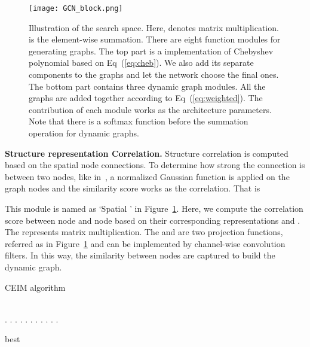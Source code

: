 \documentclass[letterpaper]{article} \usepackage{aaai19}  \usepackage{times}  \usepackage{helvet} \usepackage{courier}  \usepackage[hyphens]{url}  \usepackage{graphicx} \urlstyle{rm} \def\UrlFont{\rm}  \usepackage{graphicx}  \frenchspacing  \setlength{\pdfpagewidth}{8.5in}  \setlength{\pdfpageheight}{11in}
\begin{document}
\begin{figure}[thbp!]
\centering
\texttt{[image: GCN\_block.png]}
\caption{\small{ Illustration of the search space. Here,  denotes matrix multiplication.  is the element-wise summation. There are eight function modules for generating graphs. The top part is a implementation of Chebyshev polynomial based on Eq~(\ref{eq:cheb}). We also add its separate components to the graphs and let the network choose the final ones. The bottom part contains three dynamic graph modules. All the graphs are added together according to Eq~(\ref{eq:weighted}). The contribution of each module works as the architecture parameters. Note that there is a softmax function before the summation operation for dynamic graphs. 
}}
\label{Fig:framework}
\vspace{0.5em}
\end{figure}

\noindent \textbf{Structure representation Correlation.} Structure correlation is computed based on the spatial node connections. To determine how strong the connection is between two nodes, like in~\cite{shi2019two}, a normalized Gaussian function is applied on the graph nodes and the similarity score works as the correlation. That is

This module is named as `Spatial ' in Figure~\ref{Fig:framework}. Here, we compute the correlation score  between node  and node  based on their corresponding representations  and . The  represents matrix multiplication. The  and  are two projection functions, referred as  in Figure~\ref{Fig:framework} and can be implemented by channel-wise convolution filters. In this way, the similarity between nodes are captured to build the dynamic graph.

\begin{algorithm}[t]
\caption{CEIM algorithm}\label{algo:CEIM}
\begin{algorithmic}[1]
\Procedure{}{}
\State 
\State 
\State 
\State 
\State 
\State 
\State 
\\



\While {}
\If {}
.
\While {}
.
\State .
\EndIf
{}.
\State .
\EndIf
\State .
\EndWhile
\EndIf \While {}
.
\EndWhile
\While {}
.
\EndWhile
{}
.
.
\State 
\State 
{}.
\State 
\State 
\State 
\State 
 
\EndWhile
\If {} \Return best 
\EndIf
\EndProcedure
\end{algorithmic}
\end{algorithm}
\end{document}

